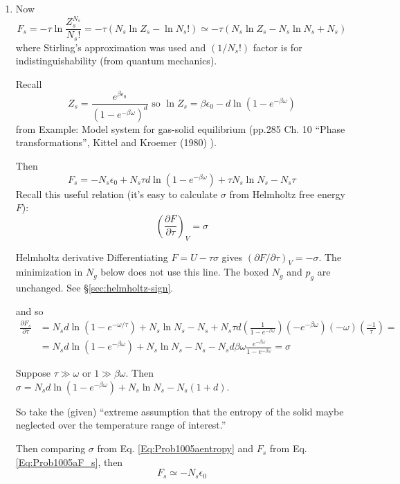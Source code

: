 \begin{enumerate}
\item[(a)] 
Now 
\[
F_s = -\tau \ln{ \frac{Z_s^{N_s} }{N_s!} } = -\tau \left( N_s \ln{Z_s} - \ln{N_s!} \right) \simeq -\tau ( N_s \ln{Z_s} - N_s \ln{N_s} + N_s )
\]
where Stirling's approximation was used and $(1/N_s!)$ factor is for indistinguishability (from quantum mechanics).  

Recall
\[
Z_s = \frac{e^{\beta \epsilon_0}}{ (1- e^{-\beta \omega})^d} \text{ so } \ln{Z_s} = \beta \epsilon_0 - d\ln{ (1-e^{-\beta \omega} )}
\]
from Example: Model system for gas-solid equilibrium (pp.285 Ch. 10 ``Phase transformations'', Kittel and Kroemer (1980) \cite{CKittelHKroemer1980}).  

Then
\begin{equation}\label{Eq:Prob1005aF_s}
  F_s = -N_s \epsilon_0 + N_s \tau d\ln{(1-e^{-\beta \omega} )} + \tau N_s \ln{ N_s} - N_s\tau
\end{equation}
Recall this useful relation (it's easy to calculate $\sigma$ from Helmholtz free energy $F$):
\[
\left( \frac{ \partial F}{ \partial \tau} \right)_V = \sigma
\]
\begin{correction}{Helmholtz derivative}
Differentiating $F = U - \tau\sigma$ gives $(\partial F/\partial\tau)_V = -\sigma$.
The minimization in $N_g$ below does not use this line.
The boxed $N_g$ and $p_g$ are unchanged.
See \S\ref{sec:helmholtz-sign}.
\end{correction}
and so
\begin{equation}\label{Eq:Prob1005aentropy}
\begin{aligned}
  \frac{ \partial F_s}{ \partial \tau} & = N_s d\ln{(1- e^{-\omega/\tau} )} + N_s \ln{ N_s} - N_s + N_s \tau d \left( \frac{1}{ 1 - e^{-\beta \omega} } \right)(-e^{-\beta \omega} )(-\omega)\left( \frac{-1}{\tau} \right) = \\
  & = N_s d\ln{ (1- e^{-\beta \omega} )} + N_s \ln{N_s} - N_s - N_s d\beta \omega \frac{e^{-\beta \omega} }{ 1 - e^{-\beta \omega} } = \sigma
\end{aligned}
\end{equation}


Suppose $\tau \gg \omega$ or $1 \gg \beta \omega$.  Then $\sigma = N_s d\ln{ (1-e^{-\beta \omega})} + N_s \ln{N_s} - N_s(1+d)$.  

So take the (given) ``extreme assumption that the entropy of the solid maybe neglected over the temperature range of interest.'' \cite{CKittelHKroemer1980}

Then comparing $\sigma$ from Eq. \ref{Eq:Prob1005aentropy} and $F_s$ from Eq. \ref{Eq:Prob1005aF_s}, then
\[
F_s \simeq -N_s \epsilon_0
\]



\end{enumerate}

